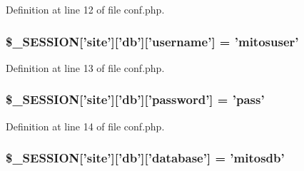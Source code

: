 \-Definition at line 12 of file conf.\-php.

\hypertarget{sites_2default_2conf_8php_a52abc60f7405711ec86306adcc75bb52}{
\subsubsection[{\$\-\_\-\-S\-E\-S\-S\-I\-O\-N}]{\setlength{\rightskip}{0pt plus 5cm}\$\-\_\-\-S\-E\-S\-S\-I\-O\-N\mbox{[}'site'\mbox{]}\mbox{[}'db'\mbox{]}\mbox{[}'username'\mbox{]} = 'mitosuser'}}\label{sites_2default_2conf_8php_a52abc60f7405711ec86306adcc75bb52}


\-Definition at line 13 of file conf.\-php.

\hypertarget{sites_2default_2conf_8php_add5af83c057b1684ddee38e593f49fe3}{
\subsubsection[{\$\-\_\-\-S\-E\-S\-S\-I\-O\-N}]{\setlength{\rightskip}{0pt plus 5cm}\$\-\_\-\-S\-E\-S\-S\-I\-O\-N\mbox{[}'site'\mbox{]}\mbox{[}'db'\mbox{]}\mbox{[}'{\bf password}'\mbox{]} = 'pass'}}\label{sites_2default_2conf_8php_add5af83c057b1684ddee38e593f49fe3}


\-Definition at line 14 of file conf.\-php.

\hypertarget{sites_2default_2conf_8php_ae6d86271937ef718137778389e84c84d}{
\subsubsection[{\$\-\_\-\-S\-E\-S\-S\-I\-O\-N}]{\setlength{\rightskip}{0pt plus 5cm}\$\-\_\-\-S\-E\-S\-S\-I\-O\-N\mbox{[}'site'\mbox{]}\mbox{[}'db'\mbox{]}\mbox{[}'database'\mbox{]} = 'mitosdb'}}\label{sites_2default_2conf_8php_ae6d86271937ef718137778389e84c84d}



